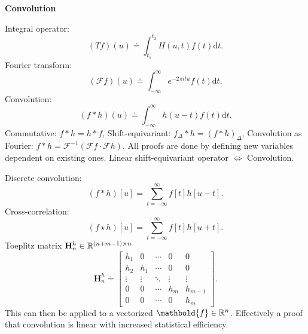 \documentclass[10pt]{article}
\newenvironment{topic}[1]
{\textbf{\sffamily \footnotesize \colorbox{black}{\rlap{\textbf{\textcolor{white}{#1}}}\hspace{\linewidth}\hspace{-2\fboxsep}}}}
{}
\newenvironment{subtopic}[1]
{\vspace{0.1cm} \begin{center}\textbf{\footnotesize \sffamily #1}\end{center}}
{}
\renewcommand{\mat}[1]{\ensuremath{\mathbf{#1}}}
\renewcommand{\vec}[1]{\ensuremath{\mathbold{#1}}}
\begin{document}
\begin{multicols*}{3}
\begin{topic}{Gradient-based learning}
    \end{topic}

    \begin{topic}{Convolutional networks}

        \begin{subtopic}{Convolution}
            Integral operator: \[
                (Tf)(u) \doteq \int_{t_1}^{t_2} H(u,t) f(t) \mathrm{d}t.
            \]
            Fourier transform: \[
                (\mathcal{F}f)(u) \doteq \int_{-\infty}^\infty e^{-2\pi itu} f(t) \mathrm{d}t.
            \]
            Convolution: \[
                (f * h)(u) \doteq \int_{-\infty}^{\infty} h(u-t) f(t) \mathrm{d}t.
            \]
            Commutative: $f * h = h * f$, Shift-equivariant: $f_{\Delta} * h = (f * h)_{\Delta}$, Convolution
            as Fourier: $f * h = \mathcal{F}^{-1}(\mathcal{F}f \cdot \mathcal{F}h)$. All proofs are done by
            defining new variables dependent on existing ones. Linear shift-equivariant operator $\iff$
            Convolution.

            Discrete convolution: \[
                (f * h)[u] = \sum_{t=-\infty}^{\infty} f[t]h[u-t].
            \]
            Cross-correlation: \[
                (f \star h)[u] = \sum_{t=-\infty}^{\infty} f[t] h[u+t].
            \]
            Toeplitz matrix $\mat{H}_n^h \in \R^{(n+m-1)\times n}$ \[
                \mat{H}_n^h \doteq
                \begin{bmatrix}
                    h_1    & 0      & \cdots & 0      & 0       \\
                    h_2    & h_1    & \cdots & 0      & 0       \\
                    \vdots & \vdots & \ddots & \vdots & \vdots  \\
                    0      & 0      & \cdots & h_m    & h_{m-1} \\
                    0      & 0      & \cdots & 0      & h_m
                \end{bmatrix}.
            \]
            This can then be applied to a vectorized $\vec{f} \in \R^n$. Effectively a proof that convolution
            is linear with increased statistical efficiency.
        \end{subtopic}


\end{topic}
\end{multicols*}
\end{document}

